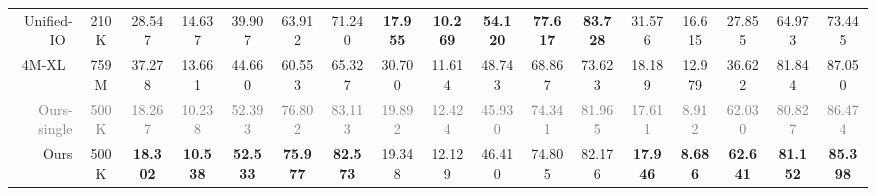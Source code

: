 \begin{table*}[t!]
\begin{center}
{\begin{tabular}{r|c|cc|ccc|cc|ccc|cc|ccc}
\hline
Unified-IO~\cite{lu2024unified} & 210K & 
28.547 & 14.637 & 39.907 & 63.912 & 71.240  &
\textbf{17.955} & \textbf{10.269} & \textbf{54.120} & \textbf{77.617} & \textbf{83.728} &
31.576 & 16.615 & 27.855 & 64.973 & 73.445  \\
4M-XL~\cite{mizrahi20234m} & 759M & 
37.278 & 13.661 & 44.660 & 60.553 & 65.327  &
30.700 & 11.614 & 48.743 & 68.867 & 73.623 &
18.189 & 12.979 & 36.622 & 81.844 & 87.050  \\

\hline
\textcolor{gray}{Ours-single} & \textcolor{gray}{500K} & 
\textcolor{gray}{18.267} & \textcolor{gray}{10.238} & \textcolor{gray}{52.393} & \textcolor{gray}{76.802} & \textcolor{gray}{83.113}  &
\textcolor{gray}{19.892} & \textcolor{gray}{12.424} & \textcolor{gray}{45.930} & \textcolor{gray}{74.341} & \textcolor{gray}{81.965} &
\textcolor{gray}{17.611} & \textcolor{gray}{8.912} & \textcolor{gray}{62.030} & \textcolor{gray}{80.827} & \textcolor{gray}{86.474}  \\
Ours & 500K & 
\textbf{18.302} & \textbf{10.538} & \textbf{52.533} & \textbf{75.977} & \textbf{82.573}  &
19.348 & 12.129 & 46.410 & 74.805 & 82.176 &
\textbf{17.946} & \textbf{8.686} & \textbf{62.641} & \textbf{81.152} & \textbf{85.398}  \\
\bottomrule
\end{tabular}
}
\end{center}
\label{tab:normal}
\end{table*}